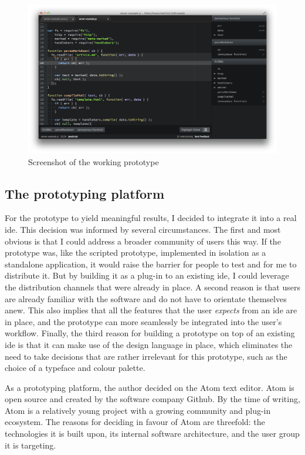 \begin{figure}[H]
\centering
\includegraphics[keepaspectratio,width=1\textwidth]{img/scope-inspector.png}
\caption{Screenshot of the working prototype}
\label{fig:scriptedprototype}
\end{figure}

\subsection{The prototyping platform}\label{the-prototyping-platform}

For the prototype to yield meaningful results, I decided to integrate it
into a real \ac{ide}. This decision was informed by several
circumstances. The first and most obvious is that I could address a
broader community of users this way. If the prototype was, like the
scripted prototype, implemented in isolation as a standalone
application, it would raise the barrier for people to test and for me to
distribute it. But by building it as a plug-in to an existing \ac{ide},
I could leverage the distribution channels that were already in place. A
second reason is that users are already familiar with the software and
do not have to orientate themselves anew. This also implies that all the
features that the user \emph{expects} from an \ac{ide} are in place, and
the prototype can more seamlessly be integrated into the user’s
workflow. Finally, the third reason for building a prototype on top of
an existing \ac{ide} is that it can make use of the design language in
place, which eliminates the need to take decisions that are rather
irrelevant for this prototype, such as the choice of a typeface and
colour palette.

As a prototyping platform, the author decided on the Atom text editor.
Atom is open source and created by the software company Github. By the
time of writing, Atom is a relatively young project with a growing
community and plug-in ecosystem. The reasons for deciding in favour of
Atom are threefold: the technologies it is built upon, its internal
software architecture, and the user group it is targeting.

